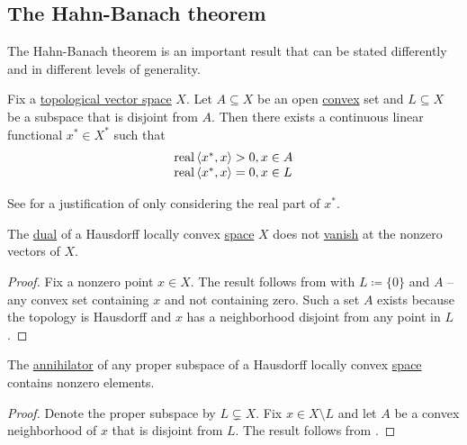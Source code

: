 \subsection{The Hahn-Banach theorem}\label{subsec:hahn_banach}

The Hahn-Banach theorem is an important result that can be stated differently and in different levels of generality.

\begin{Theorem}\label{thm:geometric_hahn_banach}\cite[24]{Йоффе1974}
  Fix a \hyperref[def:topological_vector_space]{topological vector space} \( X \). Let \( A \subseteq X \) be an open \hyperref[def:convex_set]{convex} set and \( L \subseteq X \) be a subspace that is disjoint from \( A \). Then there exists a continuous linear functional \( x^* \in X^* \) such that
  \begin{equation*}
    \begin{array}{l}
      \operatorname{real} \left\langle x^*, x \right\rangle > 0, x \in A \\
      \operatorname{real} \left\langle x^*, x \right\rangle = 0, x \in L
    \end{array}
  \end{equation*}

  See  for a justification of only considering the real part of \( x^* \).
\end{Theorem}

\begin{Corollary}\label{thm:hahn_banach_implies_functionals_vanish_nowhere}\cite[24]{Йоффе1974}
  The \hyperref[def:dual_vector_space]{dual} of a Hausdorff locally convex \hyperref[def:locally_convex_space]{space} \( X \) does not \hyperref[def:functions_vanish_nowhere]{vanish} at the nonzero vectors of \( X \).
\end{Corollary}
\begin{proof}
  Fix a nonzero point \( x \in X \). The result follows from  with \( L \coloneqq \{ 0 \} \) and \( A \) -- any convex set containing \( x \) and not containing zero. Such a set \( A \) exists because the topology is Hausdorff and \( x \) has a neighborhood disjoint from any point in \( L \).
\end{proof}

\begin{Corollary}\label{thm:hahn_banach_implies_annihilator_nontrivial}\cite[25]{Йоффе1974}
  The \hyperref[def:vector_space_annihilator]{annihilator} of any proper subspace of a Hausdorff locally convex \hyperref[def:locally_convex_space]{space} contains nonzero elements.
\end{Corollary}
\begin{proof}
  Denote the proper subspace by \( L \subsetneq X \). Fix \( x \in X \setminus L \) and let \( A \) be a convex neighborhood of \( x \) that is disjoint from \( L \). The result follows from .
\end{proof}

